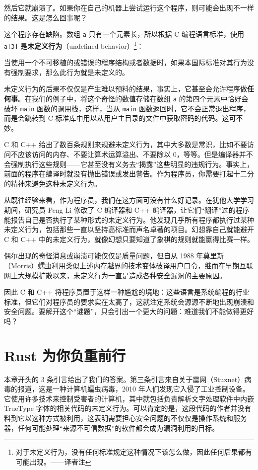然后它就崩溃了。如果你在自己的机器上尝试运行这个程序，则可能会出现不一样的结果。这是怎么回事呢？

这个程序存在缺陷。数组 \texttt{a} 只有一个元素长，所以根据 C 编程语言标准，使用 \texttt{a[3]} 是\textbf{未定义行为}（undefined behavior）\footnote{对于未定义行为，没有任何标准规定这种情况下该怎么做，因此任何后果都有可能出现。——译者注}：

\begin{myNote}
当使用一个不可移植的或错误的程序结构或者数据时，如果本国际标准对其行为没有强制要求，那么此行为就是未定义的。
\end{myNote}

未定义行为的后果不仅仅是产生难以预料的结果，事实上，它甚至会允许程序做\textbf{任何事}。在我们的例子中，将这个奇怪的数值存储在数组 \texttt{a} 的第四个元素中恰好会破坏 \texttt{main} 函数的调用栈，这样，当从 \texttt{main} 函数返回时，它不会正常退出程序，而是会跳转到 C 标准库中用以从用户主目录的文件中获取密码的代码。这可不妙。

C 和 C++ 给出了数百条规则来规避未定义行为，其中大多数是常识，比如不要访问不应该访问的内存、不要让算术运算溢出、不要除以 0，等等。但是编译器并不会强制执行这些规则——它甚至没有义务去“揭露”这些明显的违规行为。事实上，前面的程序在编译时就没有抛出错误或发出警告。作为程序员，你需要打起十二分的精神来避免这种未定义行为。

从既往经验来看，作为程序员，我们在这方面可没有什么好记录。在犹他大学学习期间，研究员 Peng Li 修改了 C 编译器和 C++ 编译器，让它们“翻译”过的程序能报告自己是否执行了某种形式的未定义行为。他发现几乎所有程序都执行过某种未定义行为，包括那些一直以坚持高标准而声名卓著的项目。幻想靠自己就能避开 C 和 C++ 中的未定义行为，就像幻想只要知道了象棋的规则就能赢得比赛一样。

偶尔出现的奇怪消息或崩溃可能仅仅是质量问题，但自从 1988 年莫里斯（Morris）蠕虫利用类似上述内存越界的技术变体破译用户口令，继而在早期互联网上大规模扩散以来，未定义行为一直是造成各种安全漏洞的主要原因。

因此 C 和 C++ 将程序员置于这样一种尴尬的境地：这些语言是系统编程的行业标准，但它们对程序员的要求实在太高了，这就注定系统会源源不断地出现崩溃和安全问题。要解开这个“谜题”，只会引出一个更大的问题：难道我们不能做得更好吗？

\section{Rust 为你负重前行}

本章开头的 3 条引言给出了我们的答案。第三条引言来自关于震网（Stuxnet）病毒的报道，这是一种计算机蠕虫病毒，2010 年人们发现它入侵了工业控制设备。它使用许多技术来控制受害者的计算机，其中就包括负责解析文字处理软件中内嵌 TrueType 字体的相关代码的未定义行为。可以肯定的是，这段代码的作者并没有料到它以这种方式被利用，这表明需要担心安全问题的不仅仅是操作系统和服务器，任何可能处理“来源不可信数据”的软件都会成为漏洞利用的目标。

